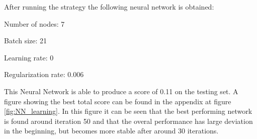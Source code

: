After running the strategy the following neural network is obtained:
\begin{description}
	\item Number of nodes: 7  
	\item Batch size: 21
	\item Learning rate: 0
	\item Regularization rate: 0.006
\end{description}
This Neural Network is able to produce a score of 0.11 on the testing set. A figure showing the best total score can be found in the appendix at figure \ref{fig:NN_learning}. In this figure it can be seen that the best performing network is found around iteration 50 and that the overal performance has large deviation in the beginning, but becomes more stable after around 30 iterations.
